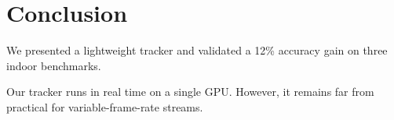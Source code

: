 \documentclass{article}
\begin{document}
\section{Conclusion}
We presented a lightweight tracker and validated a 12\% accuracy gain on three indoor benchmarks.

Our tracker runs in real time on a single GPU.
However, it remains far from practical for variable-frame-rate streams.
\end{document}
